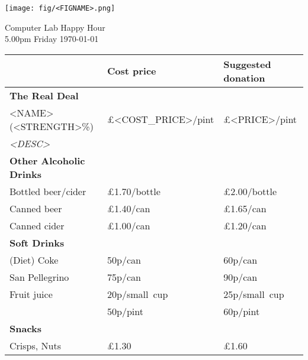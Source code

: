 \documentclass[a4paper,12pt]{article}
\begin{document}
\thispagestyle{empty}

\begin{center}
	\texttt{[image: fig/<FIGNAME>.png]} \par \bigskip \bigskip \bigskip
    {\Large Computer Lab Happy Hour} \\ \smallskip
    {5.00pm Friday \today}
\end{center}

\bigskip

\large
\begin{center}

\def\arraystretch{1.1}

\begin{tabular}{p{7.5cm}|p{3cm}|p{3cm}} & \textbf{Cost price} & \textbf{Suggested donation} \\
\hline
\textbf{The Real Deal} & & \\
<NAME> (<STRENGTH>\%) & \pounds <COST_PRICE>/pint & \pounds <PRICE>/pint \\
\small \it <DESC> \medskip & & \\

\hline
{\bf Other Alcoholic Drinks} & & \\
Bottled beer/cider & \pounds 1.70/bottle & \pounds 2.00/bottle \\
Canned beer & \pounds 1.40/can & \pounds 1.65/can \\
Canned cider & \pounds 1.00/can & \pounds 1.20/can \medskip \\

\hline
{\bf Soft Drinks} &&\\
(Diet) Coke & 50p/can  & 60p/can \\
San Pellegrino & 75p/can & 90p/can \medskip \\
Fruit juice & 20p/small~cup & 25p/small~cup \\
& 50p/pint & 60p/pint \medskip \\

\hline
{\bf Snacks} & & \\
Crisps, Nuts &\pounds 1.30 &\pounds 1.60 \\

\end{tabular}
\end{center}
\end{document}
